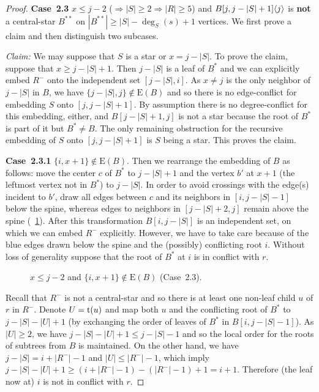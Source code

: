 \documentclass[11pt,a4paper,colorlinks=true,urlcolor=blue,citecolor=red]{article}
\theoremstyle{plain}
\newcommand{\case}[1]{\par\vspace{.5\baselineskip}\noindent\textbf{\sffamily Case~#1}}
\newcommand{\EB}{\mathrm{E}(B)}
\begin{document}
\begin{proof}
  \case{2.3} $x\le j-2$ ($\Rightarrow|S|\ge 2\Rightarrow|R|\ge 5$) and
  $B{[j,j-|S|+1]}\langle{j}\rangle$ is \textbf{not} a central-star $B^{**}$ on
  $|B^{**}|\ge|S|-\deg_S(s)+1$ vertices. We first prove a claim and then
  distinguish two subcases.

  \emph{Claim:} We may suppose that $S$ is a star or $x=j-|S|$. To prove
  the claim, suppose that $x\ge j-|S|+1$. Then $j-|S|$ is a leaf of
  $B^*$ and we can explicitly embed $R^-$ onto the independent set
  $[j-|S|,i]$. As $x\neq j$ is the only neighbor of $j-|S|$ in $B$, we
  have $\{j-|S|,j\}\notin\EB$ and so there is no edge-conflict for
  embedding $S$ onto $[j,j-|S|+1]$. By assumption there is no
  degree-conflict for this embedding, either, and $B[j-|S|+1,j]$ is not
  a star because the root of $B^*$ is part of it but $B^*\ne B$. The
  only remaining obstruction for the recursive embedding of $S$ onto
  $[j,j-|S|+1]$ is $S$ being a star. This proves the claim.

  \case{2.3.1} $\{i,x+1\}\notin\EB$. Then we rearrange the
  embedding of $B$ as follows: move the center $c$ of $B^*$ to $j-|S|+1$
  and the vertex $b'$ at $x+1$ (the leftmost vertex not in $B^*$) to
  $j-|S|$. In order to avoid crossings with the edge(s) incident to
  $b'$, draw all edges between $c$ and its neighbors in $[i,j-|S|-1]$
  below the spine, whereas edges to neighbors in $[j-|S|+2,j]$ remain
  above the spine (\figurename~\ref{fig:large_blue_star}). After this
  transformation $B[i,j-|S|]$ is an independent set, on which we can
  embed $R^-$ explicitly. However, we have to take care because of the
  blue edges drawn below the spine and the (possibly) conflicting root
  $i$. Without loss of generality suppose that the root of $B^*$ at $i$
  is in conflict with $r$.
\begin{figure}[htbp]
    \centering\hfil {}\hfil
    \hfil
    \caption{$x\le j-2$ and $\{i,x+1\}\notin\EB$
      (Case~2.3).\label{fig:large_blue_star}}
  \end{figure}


  Recall that $R^-$ is not a central-star and so there is at least one
  non-leaf child $u$ of $r$ in $R^-$. Denote $U=\mathrm t(u)$ and map both $u$
  and the conflicting root of $B^*$ to $j-|S|-|U|+1$ (by exchanging the
  order of leaves of $B^*$ in $B[i,j-|S|-1]$). As $|U|\ge 2$, we have
  $j-|S|-|U|+1\le j-|S|-1$ and so the local order for the roots of
  subtrees from $B$ is maintained. On the other hand, we have
  $j-|S|=i+|R^-|-1$ and $|U|\le|R^-|-1$, which imply
  $j-|S|-|U|+1\ge(i+|R^-|-1)-(|R^-|-1)+1=i+1$. Therefore (the leaf now
  at) $i$ is not in conflict with $r$.


\end{proof}
\end{document}
